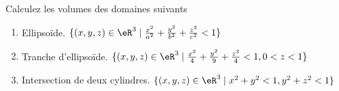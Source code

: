 
\begin{exercice}\label{exoIntMult0005}

Calculez les volumes des domaines suivants
\begin{enumerate}
\item
Ellipsoïde.
 $ \{ (x,y,z)\in \eR^3 \mid \frac{x^2}{a^2} + \frac{y^2}{b^2} +  \frac{z^2}{c^2} < 1  \}$
\item
Tranche d'ellipsoïde.
 $ \{ (x,y,z)\in \eR^3 \mid  \frac{x^2}{4} + \frac{y^2}{9} +  \frac{z^2}{4} < 1, 0<z<1   \}$
\item
Intersection de deux cylindres.
$ \{ (x,y,z)\in \eR^3 \mid x^2+y^2<1, y^2+z^2<1   \}$
\end{enumerate}

\end{exercice}

